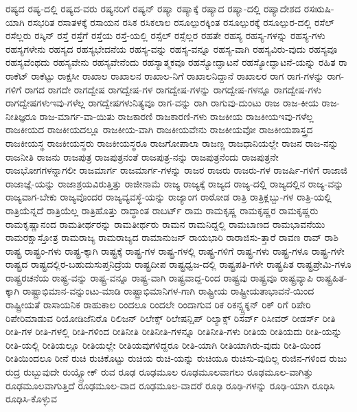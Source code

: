 {ರಷ್ಯದ
ರಷ್ಯ-ದಲ್ಲಿ
ರಷ್ಯದ-ವರು
ರಷ್ಯನರಿಗೆ
ರಷ್ಯನ್
ರಷ್ಯಾ
ರಷ್ಯಾಕ್ಕೆ
ರಷ್ಯಾದ
ರಷ್ಯಾ-ದಲ್ಲಿ
ರಷ್ಯಾದೇಶದ
ರಸಋಷಿ-ಯಾಗಿ
ರಸಭರಿತ
ರಸಾತಳಕ್ಕೆ
ರಸಾಯನ
ರಸಿಕ
ರಸಿಕಲಾಲ
ರಸೂಲ್ಪುರಕ್ಕಿಂತ
ರಸೂಲ್ಪುರಕ್ಕೆ
ರಸೂಲ್ಪುರ-ದಲ್ಲಿ
ರಸೆಲ್
ರಸೆಲ್ಲರು
ರಸ್ಕಿನ್
ರಸ್ತೆ
ರಸ್ತೆಗೆ
ರಸ್ತೆಯ
ರಸ್ತೆ-ಯಲ್ಲಿ
ರಸ್ಸೆಲ್
ರಸ್ಸೆಲ್ಲರ
ರಹತೇ
ರಹಸ್ಯ
ರಹಸ್ಯ-ಗಳನ್ನು
ರಹಸ್ಯ-ಗಳು
ರಹಸ್ಯಗಳೇನು
ರಹಸ್ಯದ
ರಹಸ್ಯಭೇದನೆಯ
ರಹಸ್ಯ-ವನ್ನು
ರಹಸ್ಯ-ವನ್ನೂ
ರಹಸ್ಯ-ವಾಗಿ
ರಹಸ್ಯವಿರು-ವುದು
ರಹಸ್ಯವೂ
ರಹಸ್ಯವೆಂಥದು
ರಹಸ್ಯವೇನು
ರಹಸ್ಯವೇನೆಂದು
ರಹಸ್ಯಾತ್ಮಕವೂ
ರಹಸ್ಯೋದ್ಘಾಟನೆ
ರಹಸ್ಯೋದ್ಘಾಟನೆ-ಯನ್ನು
ರಹಿತ
ರಾ
ರಾಕೆಟ್
ರಾಕೆಟ್ಟು
ರಾಕ್ಷಸೀ
ರಾಖಾಲ
ರಾಖಾಲನ
ರಾಖಾಲ-ನಿಗೆ
ರಾಖಾಲನಿದ್ದಾನೆ
ರಾಖಾಲರ
ರಾಗ
ರಾಗ-ಗಳನ್ನು
ರಾಗ-ಗಳಿಗೆ
ರಾಗದ
ರಾಗದೇ
ರಾಗದ್ವೇಷ
ರಾಗದ್ವೇಷ-ಗಳ
ರಾಗದ್ವೇಷ-ಗಳನ್ನು
ರಾಗದ್ವೇಷ-ಗಳನ್ನೂ
ರಾಗದ್ವೇಷ-ಗಳು
ರಾಗದ್ವೇಷಗಳುಇವು-ಗಳೆಲ್ಲ
ರಾಗದ್ವೇಷಗಳುನಿತ್ಯವೂ
ರಾಗ-ವನ್ನು
ರಾಗಿ
ರಾಗುವು-ದುಂಟು
ರಾಜ
ರಾಜ-ಕೀಯ
ರಾಜ-ನೀತಿಜ್ಞರೂ
ರಾಜ-ಮಾರ್ಗ-ವಾ-ಯಿತು
ರಾಜಕಾರಣಿ
ರಾಜಕಾರಣಿ-ಗಳು
ರಾಜಕೀಯ
ರಾಜಕೀಯಇವು-ಗಳೆಲ್ಲ
ರಾಜಕೀಯದ
ರಾಜಕೀಯದಲ್ಲೂ
ರಾಜಕೀಯ-ವಾಗಿ
ರಾಜಕೀಯವೇನು
ರಾಜಕೀಯವೋ
ರಾಜಕೀಯಶಾಸ್ತ್ರದ
ರಾಜಕೀಯಸ್ಥ
ರಾಜಕೀಯಸ್ಥರು
ರಾಜಕೀಯಸ್ಥರೂ
ರಾಜಗೋಪಾಲಾ
ರಾಜಣ್ಣ
ರಾಜಧಾನಿಯಲ್ಲೇ
ರಾಜನ
ರಾಜ-ನನ್ನು
ರಾಜನೀತಿ
ರಾಜನು
ರಾಜಪುತ್ರ
ರಾಜಪುತ್ರನಂತೆ
ರಾಜಪುತ್ರ-ನನ್ನು
ರಾಜಪುತ್ರನೆಂದು
ರಾಜಪುತ್ರನೇ
ರಾಜಭೋಗಗಳನ್ನಾಗಲೀ
ರಾಜಮಾರ್ಗ
ರಾಜಮಾರ್ಗ-ಗಳನ್ನು
ರಾಜರ
ರಾಜರು
ರಾಜರು-ಗಳ
ರಾಜರ್ಷಿ-ಗಳಿಗೆ
ರಾಜಾಜಿ
ರಾಜಾಜ್ಞೆ-ಯನ್ನು
ರಾಜಾಶ್ರಯವಿರುತ್ತಿತ್ತು
ರಾಜೀನಾಮೆ
ರಾಜ್ಯ
ರಾಜ್ಯಕ್ಕೆ
ರಾಜ್ಯದ
ರಾಜ್ಯ-ದಲ್ಲಿ
ರಾಜ್ಯದಲ್ಲಿನ
ರಾಜ್ಯ-ವನ್ನು
ರಾಜ್ಯವಾಗ-ಬೇಕು
ರಾಜ್ಯವೊಂದರ
ರಾಜ್ಯವ್ಯವಸ್ಥೆ-ಯನ್ನು
ರಾಜ್ಯಾಂಗ
ರಾಠೋಡ
ರಾತ್ರಿ
ರಾತ್ರಿಕ್ಲಬ್ಬು-ಗಳ
ರಾತ್ರಿ-ಯಲ್ಲಿ
ರಾತ್ರಿಯೆನ್ನದೆ
ರಾತ್ರಿಯೆಲ್ಲ
ರಾತ್ರಿಹೊತ್ತು
ರಾದ್ಧಾಂತ
ರಾಬರ್ಟ್
ರಾಮ
ರಾಮಕೃಷ್ಣ
ರಾಮಕೃಷ್ಣರ
ರಾಮಕೃಷ್ಣರು
ರಾಮಕೃಷ್ಣಾನಂದ
ರಾಮತೀರ್ಥರನ್ನು
ರಾಮತೀರ್ಥರು
ರಾಮನ
ರಾಮನಿದ್ದಲ್ಲಿ
ರಾಮಬಾಣದ
ರಾಮಭಾವನೆಯು
ರಾಮರಕ್ಷಾಸ್ತೋತ್ರ
ರಾಮರಾಜ್ಯ
ರಾಮರಾಜ್ಯದ
ರಾಮಾನುಜನ್
ರಾಯಭಾರಿ
ರಾರಾಜಿಸು-ತ್ತಾರೆ
ರಾವಣ
ರಾವ್
ರಾಶಿ
ರಾಷ್ಟ್ರ
ರಾಷ್ಟ್ರಂ-ಗಳು
ರಾಷ್ಟ್ರ-ಕ್ಕಾಗಿ
ರಾಷ್ಟ್ರಕ್ಕೆ
ರಾಷ್ಟ್ರ-ಗಳ
ರಾಷ್ಟ್ರ-ಗಳಲ್ಲಿ
ರಾಷ್ಟ್ರ-ಗಳಿಗೆ
ರಾಷ್ಟ್ರ-ಗಳು
ರಾಷ್ಟ್ರ-ಗಳೂ
ರಾಷ್ಟ್ರ-ಗಳೇ
ರಾಷ್ಟ್ರದ
ರಾಷ್ಟ್ರದಲ್ಲಿರ-ಬಹುದುಸುಪ್ತನಿದ್ರೆಯ
ರಾಷ್ಟ್ರದೀಪ
ರಾಷ್ಟ್ರಧ್ವಜ-ದಲ್ಲಿ
ರಾಷ್ಟ್ರಪತಿ-ಗಳೇ
ರಾಷ್ಟ್ರಪಿತ
ರಾಷ್ಟ್ರಪ್ರೇಮಿ-ಗಳೂ
ರಾಷ್ಟ್ರರಚನೆಯ
ರಾಷ್ಟ್ರ-ವನ್ನು
ರಾಷ್ಟ್ರ-ವನ್ನೂ
ರಾಷ್ಟ್ರ-ವಾಗಿ
ರಾಷ್ಟ್ರವಾದ್ದ-ರಿಂದ
ರಾಷ್ಟ್ರವು
ರಾಷ್ಟ್ರವೂ
ರಾಷ್ಟ್ರವ್ಯಾಪಿ
ರಾಷ್ಟ್ರಹಿತ-ಕ್ಕಾಗಿ
ರಾಷ್ಟ್ರಾಭಿಮಾನ-ವನ್ನುಂಟು-ಮಾಡಿ
ರಾಷ್ಟ್ರಾಭಿಮಾನಿಗಳ-ಗಾಗಿ
ರಾಷ್ಟ್ರೀಯ
ರಾಷ್ಟ್ರೀಯತಾಭಾವನೆ-ಯಿಂದ
ರಾಷ್ಟ್ರೀಯತೆ
ರಾಸಾಯನಿಕ
ರಾಹುಕಾಲ
ರಿಂದಲೂ
ರಿಂದಲೇ
ರಿಂದಾಗುವ
ರಿಕ
ರಿಕನ್ಸ್ಟ್ರಕ್ಶನ್
ರಿಕ್
ರಿಗೆ
ರಿಪೇರಿ
ರಿಪೇರಿಮಾಡುವ
ರಿಯೋಡಿಜೆನಿರೊ
ರಿಲಿಜನ್
ರಿಲೇಕ್ಸ್
ರಿಲೇಷನ್ಷಿಪ್
ರಿಲ್ಯಾಕ್ಸ್
ರಿಸರ್ವ್
ರಿಸೀವರ್
ರೀಡರ್ಸ್
ರೀತಿ
ರೀತಿ-ಗಳ
ರೀತಿ-ಗಳಲ್ಲಿ
ರೀತಿ-ಗಳಿಂದ
ರೀತಿನೀತಿ
ರೀತಿನೀತಿ-ಗಳನ್ನೂ
ರೀತಿನೀತಿ-ಗಳು
ರೀತಿಯ
ರೀತಿಯದು
ರೀತಿ-ಯನ್ನು
ರೀತಿ-ಯಲ್ಲಿ
ರೀತಿಯಲ್ಲೂ
ರೀತಿಯಲ್ಲೇ
ರೀತಿಯವುಗಳಿದ್ದರೂ
ರೀತಿ-ಯಾಗಿ
ರೀತಿಯಾಗಿರು-ವುದು
ರೀತಿ-ಯಿಂದ
ರೀತಿಯಿಂದಲೂ
ರೀನೆ
ರುಚಿ
ರುಚಿಕೊಟ್ಟು
ರುಚಿಯ
ರುಚಿ-ಯನ್ನು
ರುಚಿಯೂ
ರುಚಿಸು-ವುದಿಲ್ಲ
ರುಜಿನ-ಗಳಿಂದ
ರುಜು
ರುದ್ರ
ರುಬ್ಬುವುದೇ
ರುಯ್ಸ್ಬ್ರೋಕ್
ರುವ
ರೂಢ
ರೂಢಮೂಲ
ರೂಢಮೂಲವಾಗಲು
ರೂಢಮೂಲ-ವಾಗಿತ್ತು
ರೂಢಮೂಲವಾಗುತ್ತಿದೆ
ರೂಢಮೂಲ-ವಾದ
ರೂಢಮೂಲ-ವಾದರೆ
ರೂಢಿ
ರೂಢಿ-ಗಳನ್ನು
ರೂಢಿ-ಯಾಗಿ
ರೂಢಿಸಿ
ರೂಢಿಸಿ-ಕೊಳ್ಳುವ
}
